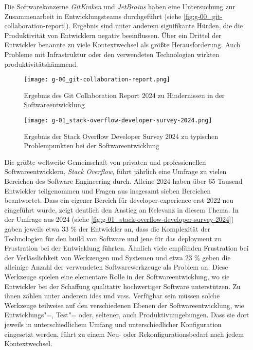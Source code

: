Die Softwarekonzerne \textit{GitKraken} und \textit{JetBrains} haben eine Untersuchung zur Zusammenarbeit in Entwicklungsteams durchgeführt (siehe \autoref{fig:g-00_git-collaboration-report}). Ergebnis sind unter anderem signifikante Hürden, die die Produktivität von Entwicklern negativ beeinflussen. Über ein Drittel der Entwickler benannte zu viele Kontextwechsel als größte Herausforderung. Auch Probleme mit Infrastruktur oder den verwendeten Technologien wirkten produktivitätshämmend. \cite{213:2024-State-of-Git-Collaboration}

\pagebreak[4]

\begin{figure}[h]
    \centering
    \begin{minipage}[b]{0.39\textwidth}
        \centering
        \texttt{[image: g-00\_git-collaboration-report.png]}
        \caption{Ergebnis des Git Collaboration Report 2024 zu Hindernissen in der Softwareentwicklung \cite{213:2024-State-of-Git-Collaboration}}
        \label{fig:g-00_git-collaboration-report}
    \end{minipage}
    \hfill
    \begin{minipage}[b]{0.59\textwidth}
        \centering
        \texttt{[image: g-01\_stack-overflow-developer-survey-2024.png]}
        \caption{Ergebnis der Stack Overflow Developer Survey 2024 zu typischen Problempunkten bei der Softwareentwicklung \cite{212:Developer-Survey}}
        \label{fig:g-01_stack-overflow-developer-survey-2024}
    \end{minipage}
\end{figure}

Die größte weltweite Gemeinschaft von privaten und professionellen Softwareentwicklern, \textit{Stack Overflow}, führt jährlich eine Umfrage zu vielen Bereichen des Software Engineering durch. Alleine 2024 haben über 65 Tausend Entwickler teilgenommen und Fragen aus insgesamt sieben Bereichen beantwortet. Dass ein eigener Bereich für \Gls{developer-experience} erst 2022 neu eingeführt wurde, zeigt deutlich den Anstieg an Relevanz in diesem Thema. \cite{212:Developer-Survey} In der Umfrage aus 2024 (siehe \autoref{fig:g-01_stack-overflow-developer-survey-2024}) gaben jeweils etwa 33 \% der Entwickler an, dass die Komplexität der Technologien für den \Gls{build} von Software und jene für das \Gls{deployment} zu Frustration bei der Entwicklung führten. Ähnlich viele empfänden Frustration bei der Verlässlichkeit von Werkzeugen und Systemen und etwa 23 \% geben die alleinige Anzahl der verwendeten Softwarewerkzeuge als Problem an. \cite{206:Developer-Survey-2024} Diese Werkzeuge spielen eine elementare Rolle in der Softwareentwicklung, wo sie Entwickler bei der Schaffung qualitativ hochwertiger Software unterstützen. Zu ihnen zählen unter anderem \glspl{ide} und \glspl{vcs}. \cite{014:Managing-Container-based-Software-Development-Environments} Verfügbar sein müssen solche Werkzeuge teilweise auf den verschiedenen Ebenen der Softwareentwicklung, wie Entwicklungs"=, Test"= oder, seltener, auch Produktivumgebungen. Dass sie dort jeweils in unterschiedlichem Umfang und unterschiedlicher Konfiguration eingesetzt werden, führt zu einem Neu- oder Rekonfigurationsbedarf nach jedem Kontextwechsel. \cite{003:Infrastructure-from-Code}

